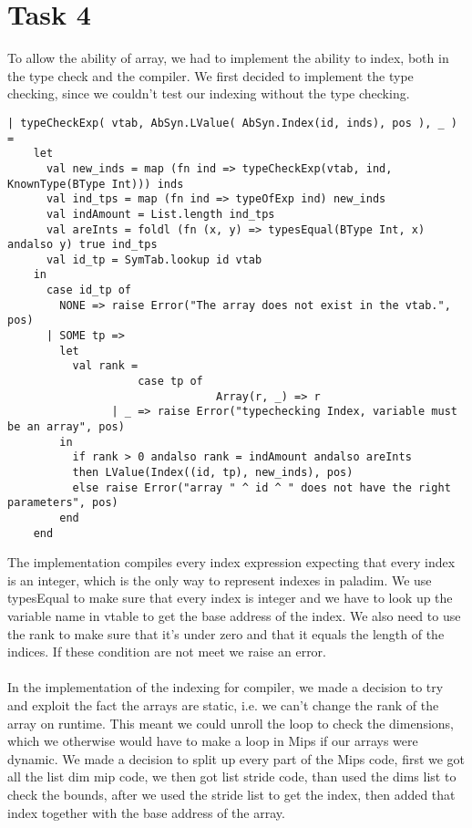 \section{Task 4}

To allow the ability of array, we had to implement the ability to index, both in the type check and the compiler. We first decided to implement
the type checking, since we couldn't test our indexing without the type checking.

\begin{lstlisting}[style=MLStyle]		
| typeCheckExp( vtab, AbSyn.LValue( AbSyn.Index(id, inds), pos ), _ ) =
    let 
      val new_inds = map (fn ind => typeCheckExp(vtab, ind, KnownType(BType Int))) inds
      val ind_tps = map (fn ind => typeOfExp ind) new_inds
      val indAmount = List.length ind_tps
      val areInts = foldl (fn (x, y) => typesEqual(BType Int, x) andalso y) true ind_tps
      val id_tp = SymTab.lookup id vtab
    in
      case id_tp of 
        NONE => raise Error("The array does not exist in the vtab.", pos)
      | SOME tp => 
        let
          val rank = 
					case tp of
								Array(r, _) => r
                | _ => raise Error("typechecking Index, variable must be an array", pos)
        in
          if rank > 0 andalso rank = indAmount andalso areInts 
          then LValue(Index((id, tp), new_inds), pos)
          else raise Error("array " ^ id ^ " does not have the right parameters", pos)
        end
    end	
\end{lstlisting}
The implementation compiles every index expression expecting that every index is an integer, which is the only way to represent indexes in 
paladim. We use typesEqual to make sure that every index is integer and we have to look up the variable name in vtable to get the base address of the index. We also need to use the rank to make sure that it's under zero and that it equals the length of the indices. If these condition are not meet we raise an error. 
\\
\\
In the implementation of the indexing for compiler, we made a decision to try and exploit the fact the arrays are static, i.e. we can't change
the rank of the array on runtime. This meant we could unroll the loop to check the dimensions, which we otherwise would have to make a loop in
Mips if our arrays were dynamic. We made a decision to split up every part of the Mips code, 
first we got all the list dim mip code, we then got list stride code, than used the dims list to check the bounds, 
after we used the stride list to get the index, then added that index together with the base address of the array. 
